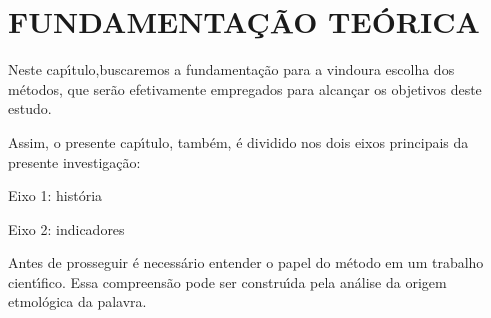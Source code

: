 \documentclass[
12pt,		%
openright,	%
twoside,  %
a4paper,			%
chapter=TITLE,		%
english,			%
french,				%
spanish,			%
brazil				%
]{USPSC-classe/USPSC}
\begin{document}
\chapter[FUNDAMENTA\c{C}\~AO TE\'ORICA]{FUNDAMENTA\c{C}\~AO TE\'ORICA}\label{FUNDAMENTA\c{C}\~AO TE\'ORICA}
Neste cap\'{\i}tulo,buscaremos a fundamenta\c{c}\~ao para a vindoura escolha dos m\'etodos, que ser\~ao efetivamente empregados para alcan\c{c}ar os objetivos deste estudo.

















Assim, o presente cap\'{\i}tulo, tamb\'em, \'e dividido nos dois eixos principais da presente investiga\c{c}\~ao:


















\begin{alineas}
\item Eixo 1: hist\'oria
\item Eixo 2: indicadores
\end{alineas}

Antes de prosseguir \'e necess\'ario entender o papel do m\'etodo em um trabalho cient\'{\i}fico. Essa compreens\~ao pode ser constru\'{\i}da pela an\'alise da origem etmol\'ogica da palavra.


















\noindent\begin{center}\mbox{\centering{}}\end{center}
\end{document}
